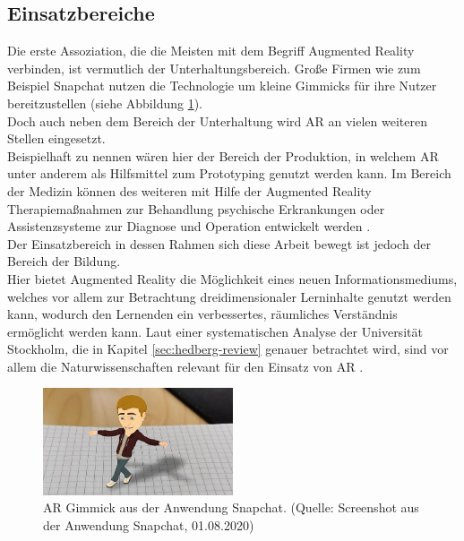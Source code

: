 \subsection{Einsatzbereiche}
Die erste Assoziation, die die Meisten mit dem Begriff Augmented Reality verbinden, ist vermutlich der Unterhaltungsbereich. Große Firmen wie zum Beispiel Snapchat nutzen die Technologie um kleine Gimmicks für ihre Nutzer bereitzustellen (siehe Abbildung \ref{fig:snapchat-ar}).\\
Doch auch neben dem Bereich der Unterhaltung wird AR an vielen weiteren Stellen eingesetzt.\\
Beispielhaft zu nennen wären hier der Bereich der Produktion, in welchem AR unter anderem als Hilfsmittel zum Prototyping \citep[S. 44]{tab:augmented-reality} genutzt werden kann. Im Bereich der Medizin können des weiteren mit Hilfe der Augmented Reality Therapiemaßnahmen zur Behandlung psychische Erkrankungen oder Assistenzsysteme zur Diagnose und Operation entwickelt werden \citep[S. 52, 54]{tab:augmented-reality}.\\
Der Einsatzbereich in dessen Rahmen sich diese Arbeit bewegt ist jedoch der Bereich der Bildung.\\
Hier bietet Augmented Reality die Möglichkeit eines neuen Informationsmediums, welches vor allem zur Betrachtung dreidimensionaler Lerninhalte genutzt werden kann, wodurch den Lernenden ein verbessertes, räumliches Verständnis ermöglicht werden kann. 
Laut einer systematischen Analyse der Universität Stockholm, die in Kapitel \ref{sec:hedberg-review} genauer betrachtet wird, sind vor allem die Naturwissenschaften relevant für den Einsatz von AR  \citep[S. 81]{hedberg:review-ar-learning}. 

\begin{figure}
\centering
\includegraphics[width=0.5\textwidth]{Abbildungen/snapchat-ar.jpg}
\caption[Snapchat AR]{AR Gimmick aus der Anwendung Snapchat. (Quelle: Screenshot aus der Anwendung Snapchat, 01.08.2020)}
\label{fig:snapchat-ar}
\end{figure}

